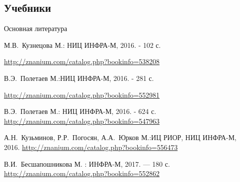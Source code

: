\documentclass[_Venture_p1.tex]{subfiles}
\begin{document}
\subsection*{Учебники}



\begin{frame}[allowframebreaks]{Основная литература}
    
  \begin{thebibliography}{10}
    
  \beamertemplatebookbibitems

М.В.~Кузнецова 
\newblock М.: НИЦ ИНФРА-М, 2016. - 102 с.

\footnotesize{\url{http://znanium.com/catalog.php?bookinfo=538208}}

В.Э.~Полетаев 
\newblock  М.:НИЦ ИНФРА-М, 2016. - 281 с. 

\footnotesize{\url{http://znanium.com/catalog.php?bookinfo=552981}}

\pagebreak

В.Э.~Полетаев  
\newblock М.: НИЦ ИНФРА-М, 2016. - 624 с.
\footnotesize{\url{http://znanium.com/catalog.php?bookinfo=547963}}

А.Н.~Кузьминов, Р.Р.~Погосян, А.А.~Юрков 
\newblock М.:ИЦ РИОР, НИЦ ИНФРА-М, 2016.
\footnotesize{\url{http://znanium.com/catalog.php?bookinfo=556473}} 

\pagebreak

В.И.~Бесшапошникова 
\newblock М. : ИНФРА-М, 2017. — 180 с. 
\footnotesize{\url{http://znanium.com/catalog.php?bookinfo=552862}}
  \end{thebibliography}
\end{frame}
\end{document}

